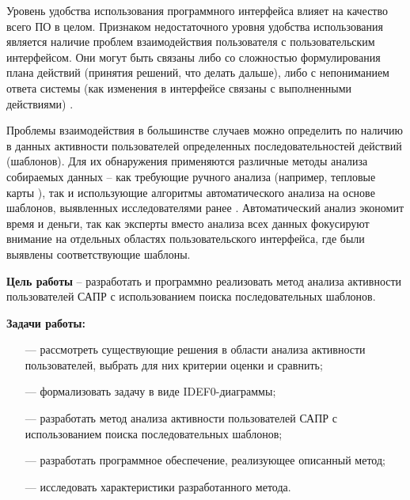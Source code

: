 
Уровень удобства использования программного интерфейса влияет на качество всего ПО в целом. Признаком недостаточного уровня удобства использования является наличие проблем взаимодействия пользователя с пользовательским интерфейсом. Они могут быть связаны либо со сложностью формулирования плана действий (принятия решений, что делать дальше), либо с непониманием ответа системы (как изменения в интерфейсе связаны с выполненными действиями) \cite{1}.

Проблемы взаимодействия в большинстве случаев можно определить по наличию в данных активности пользователей определенных последовательностей действий (шаблонов). Для их обнаружения применяются различные методы анализа собираемых данных – как требующие ручного анализа (например, тепловые карты \cite{2,3}), так и использующие алгоритмы автоматического анализа \cite{1} на основе шаблонов, выявленных исследователями ранее \cite{4, 5, 6}. Автоматический анализ экономит время и деньги, так как эксперты вместо анализа всех данных фокусируют внимание на отдельных областях пользовательского интерфейса,
где были выявлены соответствующие шаблоны.

\textbf{Цель работы} – разработать и программно реализовать метод анализа активности пользователей САПР с использованием поиска последовательных шаблонов.

\textbf{Задачи работы:}
\begin{itemize}
	\item[---] рассмотреть существующие решения в области анализа активности пользователей, выбрать для них критерии оценки и сравнить;
	\item[---] формализовать задачу в виде IDEF0-диаграммы;
	\item[---] разработать метод анализа активности пользователей САПР с использованием поиска последовательных шаблонов;
	\item[---] разработать программное обеспечение, реализующее описанный метод;
	\item[---] исследовать характеристики разработанного метода.
\end{itemize}
